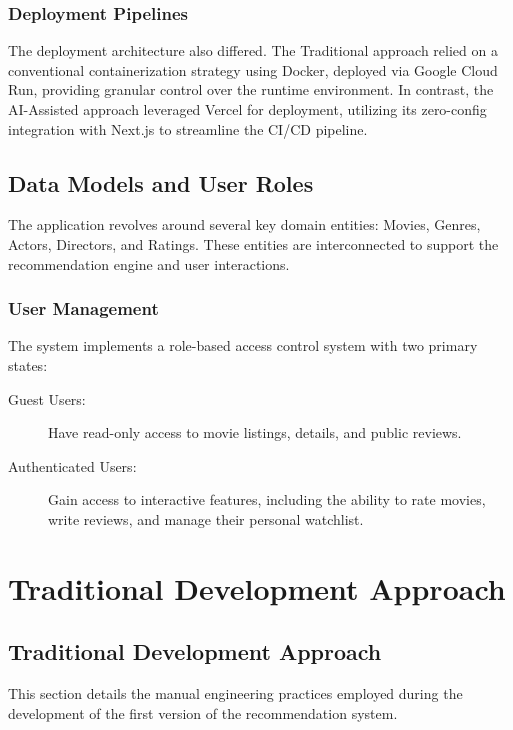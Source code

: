 \documentclass[a4paper,12pt]{report}
\begin{document}
\subsection{Deployment Pipelines}

The deployment architecture also differed. The Traditional approach relied on a conventional containerization strategy using Docker, deployed via Google Cloud Run, providing granular control over the runtime environment. In contrast, the AI-Assisted approach leveraged Vercel for deployment, utilizing its zero-config integration with Next.js to streamline the CI/CD pipeline.

\section{Data Models and User Roles}

The application revolves around several key domain entities: Movies, Genres, Actors, Directors, and Ratings. These entities are interconnected to support the recommendation engine and user interactions.

\subsection{User Management}

The system implements a role-based access control system with two primary states:

\begin{description}
    \item[Guest Users:] Have read-only access to movie listings, details, and public reviews.
    \item[Authenticated Users:] Gain access to interactive features, including the ability to rate movies, write reviews, and manage their personal watchlist.
\end{description}

\chapter{Traditional Development Approach}

\section{Traditional Development Approach}
This section details the manual engineering practices employed during the development of the first version of the recommendation system.
\end{document}
